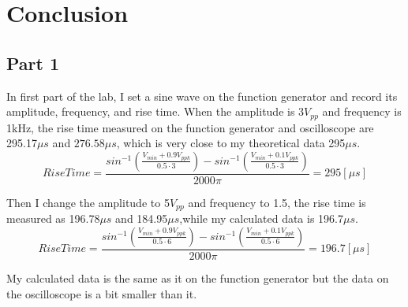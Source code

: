 \documentclass[12pt]{article}
\begin{document}
\section{Conclusion}
\subsection{Part 1}
In first part of the lab, I set a sine wave on the function generator and record its amplitude, frequency, and rise time. When the amplitude is $3V_{pp}$ and frequency is 1kHz, the rise time measured on the function generator and oscilloscope are 295.17$\mu s$ and $276.58\mu s$, which is very close to my theoretical data 295$\mu s$.
$$RiseTime=\frac{sin^{-1}(\frac{V_{min}+0.9V_{ppk}}{0.5\cdot3})-sin^{-1}(\frac{V_{min}+0.1V_{ppk}}{0.5\cdot3})}{2000\pi}=295[\mu s]$$
\par Then I change the amplitude to 5$V_{pp}$ and frequency to 1.5, the rise time is measured as 196.78$\mu s$ and 184.95$\mu s$,while my calculated data is 196.7$\mu s$.
$$RiseTime=\frac{sin^{-1}(\frac{V_{min}+0.9V_{ppk}}{0.5\cdot6})-sin^{-1}(\frac{V_{min}+0.1V_{ppk}}{0.5\cdot6})}{2000\pi}=196.7[\mu s]$$
\par My calculated data is the same as it on the function generator but the data on the oscilloscope is a bit smaller than it.
\end{document}

